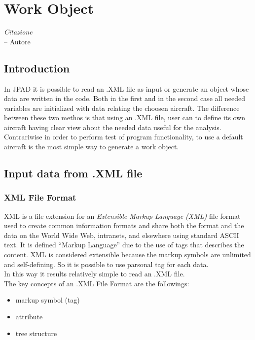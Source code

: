 \chapter{Work Object}%
\label{ch:workobject}

\begin{flushright}
	{\smaller
		\textit{Citazione}\\
		-- Autore}
\end{flushright}

\section {Introduction}
In JPAD it is possible to read an .XML file as input or generate an object whose data are written in the code. Both in the first and in the second case all needed variables are initialized with data relating the choosen aircraft. The difference between these two methos is that using an .XML file, user can to define its own aircraft having clear view about the needed data useful for the analysis.\\
Contrariwise in order to perform test of program functionality, to use a default aircraft is the most simple way to generate a work object.

\section {Input data from .XML file}
\subsection{XML File Format}
XML is a file extension for an {\itshape Extensible Markup Language (XML)} file format used to create common information formats and share both the format and the data on the World Wide Web, intranets, and elsewhere using standard ASCII text.
It is defined ``Markup Language'' due to the use of tags that describes the content. XML is considered extensible because the markup symbols are unlimited and self-defining. So it is possible to use parsonal tag for each data. \\
In this way it results relatively simple to read an .XML file.\\
The key concepts of an .XML File Format are the followings:
\begin{itemize}
\item markup symbol (tag)
\item attribute
\item tree structure
\end{itemize}

